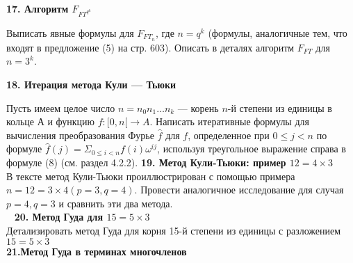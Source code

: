 \documentclass{mai_book}
\begin{document}
\medskip
\noindent
\textbf{17. Алгоритм $F_{FT^{q^{k}}}$}

\medskip
Выписать явные формулы для $F_{FT_{n}}$, где $n = q^{k}$ (формулы, аналогичные тем, что входят в предложение (5) на стр. 603). Описать в деталях алгоритм  $F_{FT}$ для $n = 3^{k}$.

\medskip
\noindent
\textbf{18. Итерация метода Кули — Тьюки}

\medskip
Пусть имеем целое число $n = n_{0}n_{1} \dots n_{k}$ --- корень $n$-й степени из единицы в кольце $А$ и функцию $f : [0,n[\rightarrow A$. Написать итеративные формулы для вычисления преобразования Фурье $\hat{f}$ для $f$, определенное при $0 \leqslant j < n$ по формуле $\hat{f}(j) = \Sigma_{0\leqslant i<n}f(i) \omega^{ij}$, используя треугольное выражение справа в формуле (8) (см. раздел 4.2.2).
\newpage
    \medskip
\noindent\textbf{19. Метод Кули-Тьюки: пример $12=4\times 3$}\\
\medskip
В тексте метод Кули-Тьюки проиллюстрирован с помощью примера\newline $n=12=3\times 4(p=3, q=4)$. Провести аналогичное исследование для случая $p=4, q=3$ и сравнить эти два метода.\\
\ \newline
\noindent\textbf{20. Метод Гуда для $15=5\times 3$}\\

Детализировать метод Гуда для корня 15-й степени из единицы с разложением $15=5\times 3$\\
 \newline
\noindent\textbf{21.Метод Гуда в терминах многочленов}\\
\end{document}
